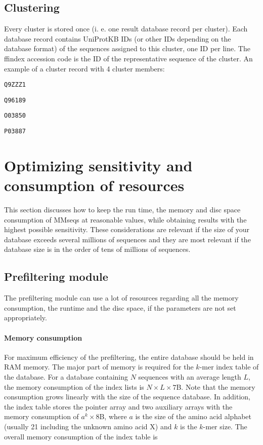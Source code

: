 \documentclass[11pt,a4paper]{report}
\begin{document}
\subsection{Clustering}

Every cluster is stored once (i. e. one result database record per
cluster). Each database record contains UniProtKB IDs (or other IDs
depending on the database format) of the sequences assigned to this
cluster, one ID per line. The ffindex accession code is the ID of
the representative sequence of the cluster. An example of a cluster
record with 4 cluster members:

\texttt{\footnotesize Q9ZZZ1 }{\footnotesize \par}

\texttt{\footnotesize Q96189 }{\footnotesize \par}

\texttt{\footnotesize O03850 }{\footnotesize \par}

\texttt{\footnotesize P03887 }{\footnotesize \par}


\section{Optimizing sensitivity and consumption of resources\label{sec:Sensitivity-and-consumption}}

This section discusses how to keep the run time, the memory and disc
space consumption of MMseqs at reasonable values, while obtaining
results with the highest possible sensitivity. These considerations
are relevant if the size of your database exceeds several millions
of sequences and they are most relevant if the database size is in
the order of tens of millions of sequences.


\subsection{Prefiltering module}

The prefiltering module can use a lot of resources regarding all the
memory consumption, the runtime and the disc space, if the parameters
are not set appropriately.


\paragraph{Memory consumption}

For maximum efficiency of the prefiltering, the entire database should
be held in RAM memory. The major part of memory is required for the
$k$-mer index table of the database. For a database containing $N$
sequences with an average length $L$, the memory consumption of the
index lists is $N\times L\times7$B. Note that the memory consumption
grows linearly with the size of the sequence database. In addition,
the index table stores the pointer array and two auxiliary arrays
with the memory consumption of $a^{k}\times8$B, where $a$ is the
size of the amino acid alphabet (usually 21 including the unknown
amino acid X) and $k$ is the $k$-mer size. The overall memory consumption
of the index table is
\end{document}
